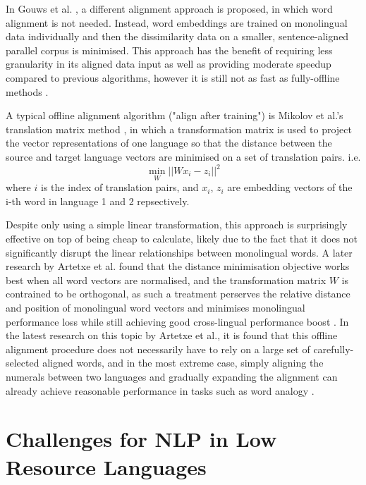 \documentclass[]{article}
\begin{document}
In Gouws et al. \cite{gouws2015bilbowa}, a different alignment approach is proposed, in which word alignment is not needed. Instead, word embeddings are trained on monolingual data individually and then the dissimilarity data on a smaller, sentence-aligned parallel corpus is minimised. This approach has the benefit of requiring less granularity in its aligned data input as well as providing moderate speedup compared to previous algorithms, however it is still not as fast as fully-offline methods \cite{gouws2015bilbowa}.

A typical offline alignment algorithm ("align after training") is Mikolov et al.'s translation matrix method \cite{mikolov2013exploiting}, in which a transformation matrix is used to project the vector representations of one language so that the distance between the source and target language vectors are minimised on a set of translation pairs. i.e.
\[ \min_W || Wx_i - z_i||^2 \] where $i$ is the index of translation pairs, and $x_i$, $z_i$ are embedding vectors of the i-th word in language 1 and 2 repsectively.

Despite only using a simple linear transformation, this approach is surprisingly effective on top of being cheap to calculate, likely due to the fact that it does not significantly disrupt the linear relationships between monolingual words. A later research by Artetxe et al. found that the distance minimisation objective works best when all word vectors are normalised, and the transformation matrix $W$ is contrained to be orthogonal, as such a treatment perserves the relative distance and position of monolingual word vectors and minimises monolingual performance loss while still achieving good cross-lingual performance boost \cite{artetxe2016learning}. In the latest research on this topic by Artetxe et al., it is found that this offline alignment procedure does not necessarily have to rely on a large set of carefully-selected aligned words, and in the most extreme case, simply aligning the numerals between two languages and gradually expanding the alignment can already achieve reasonable performance in tasks such as word analogy \cite{artetxe2017learning}.


\section{Challenges for NLP in Low Resource Languages}
\end{document}
